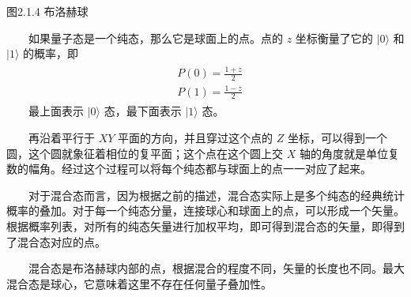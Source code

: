 \documentclass[a4paper,11pt,english]{sphinxmanual}
\begin{document}

\begin{center}图2.1.4 布洛赫球
\end{center}
\sphinxAtStartPar
  如果量子态是一个纯态，那么它是球面上的点。点的 \(z\) 坐标衡量了它的  \(|0\rangle\) 和  \(|1\rangle\) 的概率，即
\begin{equation*}
\begin{split}\begin{aligned} &P(0)=\frac{1+z}{2} \\ &P(1)=\frac{1-z}{2} \end{aligned}\end{split}
\end{equation*}
\sphinxAtStartPar
  最上面表示  \(|0\rangle\) 态，最下面表示 \(|1\rangle\) 态。

\sphinxAtStartPar
  再沿着平行于 \(XY\) 平面的方向，并且穿过这个点的 \(Z\) 坐标，可以得到一个圆，这个圆就象征着相位的复平面；这个点在这个圆上交 \(X\) 轴的角度就是单位复数的幅角。经过这个过程可以将每个纯态都与球面上的点一一对应了起来。

\sphinxAtStartPar
  对于混合态而言，因为根据之前的描述，混合态实际上是多个纯态的经典统计概率的叠加。对于每一个纯态分量，连接球心和球面上的点，可以形成一个矢量。根据概率列表，对所有的纯态矢量进行加权平均，即可得到混合态的矢量，即得到了混合态对应的点。

\sphinxAtStartPar
  混合态是布洛赫球内部的点，根据混合的程度不同，矢量的长度也不同。最大混合态是球心，它意味着这里不存在任何量子叠加性。
\end{document}
